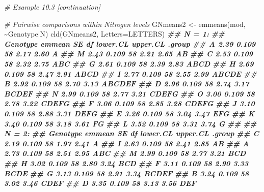 \documentclass[
  12pt,
]{book}
\newenvironment{Shaded}{\begin{snugshade}}{\end{snugshade}}
\newcommand{\AttributeTok}[1]{\textcolor[rgb]{0.77,0.63,0.00}{#1}}
\newcommand{\CommentTok}[1]{\textcolor[rgb]{0.56,0.35,0.01}{\textit{#1}}}
\newcommand{\DocumentationTok}[1]{\textcolor[rgb]{0.56,0.35,0.01}{\textbf{\textit{#1}}}}
\newcommand{\FunctionTok}[1]{\textcolor[rgb]{0.00,0.00,0.00}{#1}}
\newcommand{\NormalTok}[1]{#1}
\newcommand{\OtherTok}[1]{\textcolor[rgb]{0.56,0.35,0.01}{#1}}
\newcommand{\SpecialCharTok}[1]{\textcolor[rgb]{0.00,0.00,0.00}{#1}}
\begin{document}
\begin{Shaded}
\begin{Highlighting}[]
\CommentTok{\# Example 10.3 [continuation]}

\CommentTok{\# Pairwise comparisons within Nitrogen levels}
\NormalTok{GNmeans2 }\OtherTok{\textless{}{-}} \FunctionTok{emmeans}\NormalTok{(mod, }\SpecialCharTok{\textasciitilde{}}\NormalTok{Genotype}\SpecialCharTok{|}\NormalTok{N)}
\FunctionTok{cld}\NormalTok{(GNmeans2, }\AttributeTok{Letters=}\NormalTok{LETTERS)}
\DocumentationTok{\#\# N = 1:}
\DocumentationTok{\#\#  Genotype emmean    SE df lower.CL upper.CL .group  }
\DocumentationTok{\#\#  A          2.39 0.109 58     2.17     2.60  A      }
\DocumentationTok{\#\#  M          2.43 0.109 58     2.21     2.65  AB     }
\DocumentationTok{\#\#  C          2.53 0.109 58     2.32     2.75  ABC    }
\DocumentationTok{\#\#  G          2.61 0.109 58     2.39     2.83  ABCD   }
\DocumentationTok{\#\#  H          2.69 0.109 58     2.47     2.91  ABCD   }
\DocumentationTok{\#\#  I          2.77 0.109 58     2.55     2.99  ABCDE  }
\DocumentationTok{\#\#  B          2.92 0.109 58     2.70     3.13  ABCDEF }
\DocumentationTok{\#\#  D          2.96 0.109 58     2.74     3.17   BCDEF }
\DocumentationTok{\#\#  N          2.99 0.109 58     2.77     3.21    CDEFG}
\DocumentationTok{\#\#  O          3.00 0.109 58     2.78     3.22    CDEFG}
\DocumentationTok{\#\#  F          3.06 0.109 58     2.85     3.28    CDEFG}
\DocumentationTok{\#\#  J          3.10 0.109 58     2.88     3.31     DEFG}
\DocumentationTok{\#\#  E          3.26 0.109 58     3.04     3.47      EFG}
\DocumentationTok{\#\#  K          3.40 0.109 58     3.18     3.61       FG}
\DocumentationTok{\#\#  L          3.52 0.109 58     3.31     3.74        G}
\DocumentationTok{\#\# }
\DocumentationTok{\#\# N = 2:}
\DocumentationTok{\#\#  Genotype emmean    SE df lower.CL upper.CL .group  }
\DocumentationTok{\#\#  C          2.19 0.109 58     1.97     2.41  A      }
\DocumentationTok{\#\#  I          2.63 0.109 58     2.41     2.85  AB     }
\DocumentationTok{\#\#  A          2.73 0.109 58     2.51     2.95  ABC    }
\DocumentationTok{\#\#  M          2.99 0.109 58     2.77     3.21   BCD   }
\DocumentationTok{\#\#  H          3.02 0.109 58     2.80     3.24   BCD   }
\DocumentationTok{\#\#  F          3.11 0.109 58     2.90     3.33   BCDE  }
\DocumentationTok{\#\#  G          3.13 0.109 58     2.91     3.34   BCDEF }
\DocumentationTok{\#\#  B          3.24 0.109 58     3.02     3.46    CDEF }
\DocumentationTok{\#\#  D          3.35 0.109 58     3.13     3.56     DEF }

\end{Highlighting}
\end{Shaded}
\end{document}
